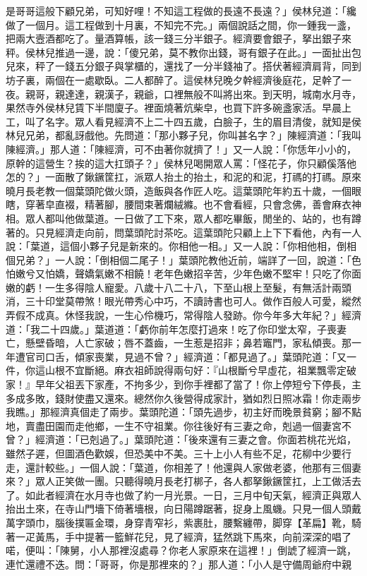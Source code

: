 \begin{showcontents}{}
是哥哥這般下顧兄弟，可知好哩！不知這工程做的長遠不長遠？」侯林兒道：「纔做了一個月。這工程做到十月裏，不知完不完。」兩個說話之間，你一鍾我一盞，把兩大壼酒都吃了。量酒算帳，該一錢三分半銀子。經濟要會銀子，拏出銀子來秤。侯林兒推過一邊，說：「傻兄弟，莫不教你出錢，哥有銀子在此。」一面扯出包兒來，秤了一錢五分銀子與掌櫃的，還找了一分半錢袖了。搭伏著經濟肩背，同到坊子裏，兩個在一處歇臥。二人都醉了。這侯林兒晚夕幹經濟後庭花，足幹了一夜。親哥，親達達，親漢子，親爺，口裡無般不叫將出來。到天明，城南水月寺，果然寺外侯林兒賃下半間廈子。裡面燒著炕柴皁，也買下許多碗盞家活。早晨上工，叫了名字。眾人看見經濟不上二十四五歲，白臉子，生的眉目清俊，就知是侯林兒兄弟，都亂訝戲他。先問道：「那小夥子兒，你叫甚名字？」陳經濟道：「我叫陳經濟。」那人道：「陳經濟，可不由著你就擠了！」又一人說：「你恁年小小的，原幹的這營生？挨的這大扛頭子？」侯林兒喝開眾人罵：「怪花子，你只顧傒落他怎的？」一面散了鍬鐝筐扛，派眾人抬土的抬土，和泥的和泥，打禡的打禡。原來曉月長老教一個葉頭陀做火頭，造飯與各作匠人吃。這葉頭陀年約五十歲，一個眼瞎，穿著皁直裰，精著腳，腰間束著爛絨縧。也不會看經，只會念佛，善會麻衣神相。眾人都叫他做葉道。一日做了工下來，眾人都吃畢飯，閒坐的、站的，也有蹲著的。只見經濟走向前，問葉頭陀討茶吃。這葉頭陀只顧上上下下看他，內有一人說：「葉道，這個小夥子兒是新來的。你相他一相。」又一人說：「你相他相，倒相個兄弟？」一人說：「倒相個二尾子！」葉頭陀教他近前，端詳了一回，說道：「色怕嫩兮又怕嬌，聲嬌氣嫩不相饒！老年色嫩招辛苦，少年色嫩不堅牢！只吃了你面嫩的虧！一生多得陰人寵愛。八歲十八二十八，下至山根上至髮，有無活計兩頭消，三十印堂莫帶煞！眼光帶秀心中巧，不讀詩書也可人。做作百般人可愛，縱然弄假不成真。休怪我說，一生心伶機巧，常得陰人發跡。你今年多大年紀？」經濟道：「我二十四歲。」葉道道：「虧你前年怎麼打過來！吃了你印堂太窄，子喪妻亡，懸壁昏暗，人亡家破；唇不蓋齒，一生惹是招非；鼻若竈門，家私傾喪。那一年遭官司口舌，傾家喪業，見過不曾？」經濟道：「都見過了。」葉頭陀道：「又一件，你這山根不宜斷絕。麻衣祖師說得兩句好：『山根斷兮早虛花，祖業飄零定破家！』早年父祖丟下家產，不拘多少，到你手裡都了當了！你上停短兮下停長，主多成多敗，錢財使盡又還來。總然你久後營得成家計，猶如烈日照冰霜！你走兩步我瞧。」那經濟真個走了兩步。葉頭陀道：「頭先過步，初主好而晚景貧窮；腳不點地，賣盡田園而走他鄉，一生不守祖業。你往後好有三妻之命，剋過一個妻宮不曾？」經濟道：「已剋過了。」葉頭陀道：「後來還有三妻之會。你面若桃花光焰，雖然子遲，但圖酒色歡娛，但恐美中不美。三十上小人有些不足，花柳中少要行走，還計較些。」一個人說：「葉道，你相差了！他還與人家做老婆，他那有三個妻來？」眾人正笑做一團。只聽得曉月長老打梆子，各人都拏鍬鐝筐扛，上工做活去了。如此者經濟在水月寺也做了約一月光景。一日，三月中旬天氣，經濟正與眾人抬出土來，在寺山門墻下倚著墻根，向日陽蹲踞著，捉身上風蟣。只見一個人頭戴萬字頭巾，腦後撲匾金環，身穿青窄衫，紫裹肚，腰繫纏帶，脚穿【革扁】靴，騎著一疋黃馬，手中提著一籃鮮花兒，見了經濟，猛然跳下馬來，向前深深的唱了喏，便叫：「陳舅，小人那裡沒處尋？你老人家原來在這裡！」倒諕了經濟一跳，連忙還禮不迭。問：「哥哥，你是那裡來的？」那人道：「小人是守備周爺府中親
\end{showcontents}
